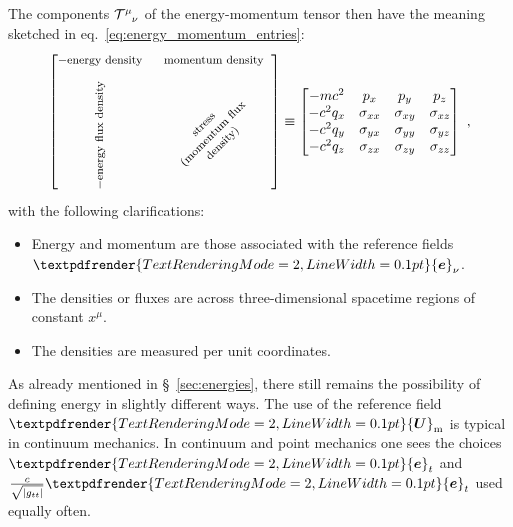 \documentclass[\ifafour a4paper,12pt,\else a5paper,10pt,\fi%
onecolumn,oneside,article,%
british%
]{memoir}
\renewcommand*{\bm}[1]{\textpdfrender{TextRenderingMode=2,LineWidth=0.1pt}{\boldsymbol{#1}}}
\DeclarePairedDelimiter\abs{\lvert}{\rvert}
\renewcommand*{\|}[1][]{\nonscript\:#1\vert\nonscript\:\mathopen{}}
\newcommand*{\sect}{\S}%
\newcommand*{\eqn}{eq.}%
\renewcommand*{\i}{{}\indices}
\newcommand*{\ve}[1]{\bm{e}_{#1}}
\newcommand*{\yT}{\mathcal{T}}
\newcommand*{\yU}{\bm{U}}
\newcommand*{\yUm}{\yU_{\textrm{m}}}
\begin{document}
The components $\yT\i{^{\mu}_{\nu}}$ of the energy-momentum tensor then have the meaning sketched in \eqn~\eqref{eq:energy_momentum_entries}:
\begin{equation}
  \label{eq:energy_momentum_entries_correct}
  \begin{bmatrix}
    \text{\footnotesize $-$energy density} &
    \text{\footnotesize momentum density} \\[2\jot]
    \rotatebox[origin=c]{90}{\text{\footnotesize $-$energy flux density}} &
    \rotatebox[origin=c]{45}{\parbox{9em}{\centering\footnotesize stress\\ (momentum flux density)}}
  \end{bmatrix}
  \equiv
    \begin{bmatrix}
    -m c^{2} & p_{x} & p_{y} & p_{z}
    \\
    -c^{2} q_{x} & \sigma_{xx} & \sigma_{xy} & \sigma_{xz}
    \\
    -c^{2} q_{y} & \sigma_{yx} & \sigma_{yy} & \sigma_{yz}
    \\
    -c^{2} q_{z} & \sigma_{zx} & \sigma_{zy} & \sigma_{zz}
  \end{bmatrix}
\ ,
\end{equation}
with the following clarifications:
\begin{itemize}[noitemsep]
\item Energy and momentum are those associated with the reference fields $\ve{\nu}$.
\item The densities or fluxes are across three-dimensional spacetime regions of constant $x^{\mu}$.
\item The densities are measured per unit coordinates.
\end{itemize}


As already mentioned in \sect~\ref{sec:energies}, there still remains the possibility of defining energy in slightly different ways. The use of the reference field $\yUm$ is typical in continuum mechanics. In continuum and point mechanics one sees the choices $\ve{t}$ and $\tfrac{c}{\sqrt{\abs{g_{tt}}}}\ve{t}$ used equally often.

\medskip
\end{document}

